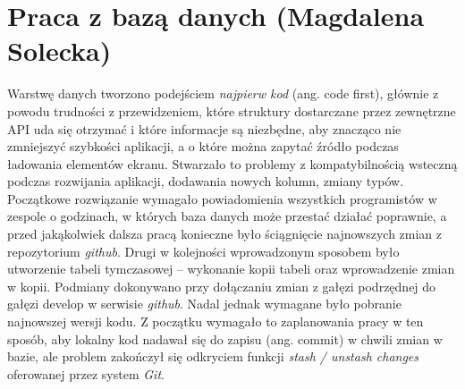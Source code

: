 \section{Praca z bazą danych (Magdalena Solecka)}
\par Warstwę danych tworzono podejściem \textit{najpierw kod} (ang. code first), głównie z powodu trudności z przewidzeniem, które struktury dostarczane przez zewnętrzne API uda się otrzymać i które informacje są niezbędne, aby znacząco nie zmniejszyć szybkości aplikacji, a o które można zapytać źródło podczas ładowania elementów ekranu. Stwarzało to problemy z kompatybilnością wsteczną podczas rozwijania aplikacji, dodawania nowych kolumn, zmiany typów. Początkowe rozwiązanie wymagało powiadomienia wszystkich programistów w zespole o godzinach, w których baza danych może przestać działać poprawnie, a przed jakąkolwiek dalsza pracą konieczne było ściągnięcie najnowszych zmian z repozytorium \textit{github}. Drugi w kolejności wprowadzonym sposobem było utworzenie tabeli tymczasowej -- wykonanie kopii tabeli oraz wprowadzenie zmian w kopii. Podmiany dokonywano przy dołączaniu zmian z gałęzi podrzędnej do gałęzi develop w serwisie \textit{github}. Nadal jednak wymagane było pobranie najnowszej wersji kodu. Z początku wymagało to zaplanowania pracy w ten sposób, aby lokalny kod nadawał się do zapisu (ang. commit) w chwili zmian w bazie, ale problem zakończył się odkryciem funkcji \textit{stash / unstash changes} oferowanej przez system \textit{Git}.
